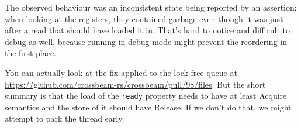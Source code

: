 The observed behaviour was an inconsistent state being reported by an assertion; when looking at the registers, they contained garbage even though it was just after a read that should have loaded it in. That's hard to notice and difficult to debug as well, because running in debug mode might prevent the reordering in the first place.

You can actually look at the fix applied to the lock-free queue at \url{https://github.com/crossbeam-rs/crossbeam/pull/98/files}. But the short summary is that the load of the \texttt{ready} property needs to have at least Acquire semantics and the store of it should have Release. If we don't do that, we might attempt to park the thread early. 




